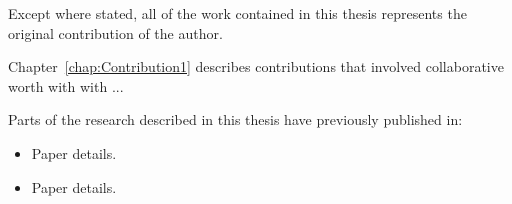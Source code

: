 \begin{declaration}
	Except where stated, all of the work contained in this thesis represents the original contribution of the author.
	
	Chapter~\ref{chap:Contribution1} describes contributions that involved collaborative worth with  with ...

	Parts of the research described in this thesis have previously published in:
	
	\begin{itemize}
		\item Paper details. 
		\item Paper details.
		
	\end{itemize}

\end{declaration}